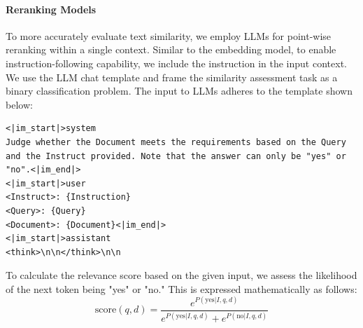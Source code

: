 \paragraph{Reranking Models} To more accurately evaluate text similarity, we employ LLMs for point-wise reranking within a single context. Similar to the embedding model, to enable instruction-following capability, we include the instruction in the input context. We use the LLM chat template and frame the similarity assessment task as a binary classification problem. The input to LLMs adheres to the template shown below:
\begin{promptblock}
\begin{verbatim}
<|im_start|>system
Judge whether the Document meets the requirements based on the Query and the Instruct provided. Note that the answer can only be "yes" or "no".<|im_end|>
<|im_start|>user
<Instruct>: {Instruction}
<Query>: {Query}
<Document>: {Document}<|im_end|>
<|im_start|>assistant
<think>\n\n</think>\n\n
\end{verbatim}
\end{promptblock}

To calculate the relevance score based on the given input, we assess the likelihood of the next token being "yes" or "no." This is expressed mathematically as follows:
\begin{equation*}
    \textrm{score}(q,d) = \frac{e^{P(\text{yes}|I,q,d)}}{e^{P(\text{yes}|I,q,d)}+e^{P(\text{no}|I,q,d)}}
\end{equation*}


